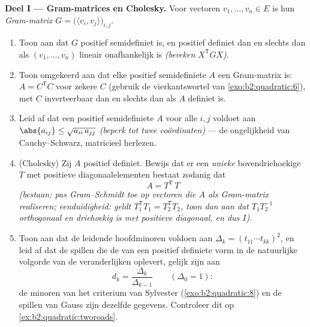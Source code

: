\begin{problem}
\medskip
\noindent\textbf{Deel I --- Gram-matrices en Cholesky.} Voor
vectoren $v_1, \dots, v_n \in E$ is hun \emph{Gram-matrix} $G =
\bigl(\langle v_i, v_j\rangle\bigr)_{i,j}$.
\begin{enumerate}
  \item Toon aan dat $G$  positief semidefiniet is, en
        positief definiet dan en slechts dan als $(v_1, \dots,
        v_n)$ lineair onafhankelijk is \emph{(bereken $X^{\mathsf
        T}GX$)}.
  \item Toon omgekeerd aan dat elke  positief
        semidefiniete $A$ een Gram-matrix is: $A = C^{\mathsf T}C$
        voor zekere $C$ (gebruik de vierkantswortel van
        \cref{exo:b2:quadratic:6}), met $C$ inverteerbaar dan en
        slechts dan als $A$ definiet is.
  \item Leid af dat een positief semidefiniete $A$ voor alle $i, j$
        voldoet aan $\abs{a_{ij}} \leq \sqrt{a_{ii}\,a_{jj}}$
        \emph{(beperk tot twee coördinaten)} --- de ongelijkheid
        van Cauchy--Schwarz, matricieel herlezen.
  \item (Cholesky) Zij $A$ positief definiet. Bewijs dat er een
        \emph{unieke} bovendriehoekige $T$ met positieve
        diagonaalelementen bestaat zodanig dat
        \[
        A = T^{\mathsf T}\,T
        \]
        \emph{(bestaan: pas Gram--Schmidt toe op vectoren die $A$
        als Gram-matrix realiseren; eenduidigheid: geldt
        $T_1^{\mathsf T}T_1 = T_2^{\mathsf T}T_2$, toon dan aan dat
        $T_1T_2^{-1}$ orthogonaal en driehoekig is met positieve
        diagonaal, en dus $I$)}.
  \item Toon aan dat de leidende hoofdminoren voldoen aan $\Delta_k
        = (t_{11}\cdots t_{kk})^2$, en leid af dat de spillen die
        de  van een positief definiete vorm in de
        natuurlijke volgorde van de veranderlijken oplevert,
        gelijk zijn aan
        \[
        d_k = \frac{\Delta_k}{\Delta_{k-1}}
        \qquad (\Delta_0 = 1) :
        \]
        de minoren van het criterium van Sylvester
        (\cref{exo:b2:quadratic:8}) en de spillen van Gauss zijn
        dezelfde gegevens. Controleer dit op
        \cref{ex:b2:quadratic:tworoads}.
\end{enumerate}


\end{problem}
